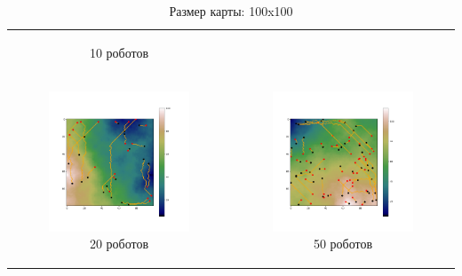\documentclass{article}
\numberwithin{equation}{section}
\begin{document}
\begin{table}[H]
\begin{tabular}{c c}
\begin{subfigure}{0.5\linewidth}
			\caption*{10 роботов}
			\end{subfigure}
			\\
            \begin{subfigure}{0.5\linewidth}
				\includegraphics[width = 1.0\columnwidth]{data/mean_paths/100x100/20.png}
			\caption*{20 роботов}
			\end{subfigure}
			&
			\begin{subfigure}{0.5\linewidth}
				\includegraphics[width = 1.0\columnwidth]{data/mean_paths/100x100/50.png}
			\caption*{50 роботов}
			\end{subfigure}
        \end{tabular}
        \caption*{Размер карты: 100x100}
	\end{table}
\end{document}
